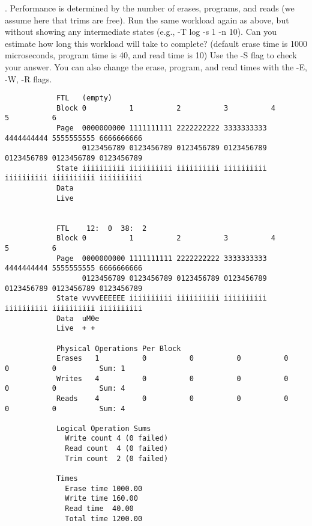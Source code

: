 \documentclass{article}
\begin{document}
. Performance is determined by the number of erases, programs, and
    reads (we assume here that trims are free). Run the same workload
    again as above, but without showing any intermediate states (e.g.,
    -T log -s 1 -n 10). Can you estimate how long this workload
    will take to complete? (default erase time is 1000 microseconds,
    program time is 40, and read time is 10) Use the -S flag to check
    your answer. You can also change the erase, program, and read
    times with the -E, -W, -R flags.\newline
    \scriptsize {
        \begin{verbatim}
            FTL   (empty)
            Block 0          1          2          3          4          5          6          
            Page  0000000000 1111111111 2222222222 3333333333 4444444444 5555555555 6666666666 
                  0123456789 0123456789 0123456789 0123456789 0123456789 0123456789 0123456789 
            State iiiiiiiiii iiiiiiiiii iiiiiiiiii iiiiiiiiii iiiiiiiiii iiiiiiiiii iiiiiiiiii 
            Data                                                                               
            Live                                                                               
            
            
            FTL    12:  0  38:  2 
            Block 0          1          2          3          4          5          6          
            Page  0000000000 1111111111 2222222222 3333333333 4444444444 5555555555 6666666666 
                  0123456789 0123456789 0123456789 0123456789 0123456789 0123456789 0123456789 
            State vvvvEEEEEE iiiiiiiiii iiiiiiiiii iiiiiiiiii iiiiiiiiii iiiiiiiiii iiiiiiiiii 
            Data  uM0e                                                                         
            Live  + +                                                                          
            
            Physical Operations Per Block
            Erases   1          0          0          0          0          0          0          Sum: 1
            Writes   4          0          0          0          0          0          0          Sum: 4
            Reads    4          0          0          0          0          0          0          Sum: 4
            
            Logical Operation Sums
              Write count 4 (0 failed)
              Read count  4 (0 failed)
              Trim count  2 (0 failed)
            
            Times
              Erase time 1000.00
              Write time 160.00
              Read time  40.00
              Total time 1200.00
        \end{verbatim}
    }
\end{document}

